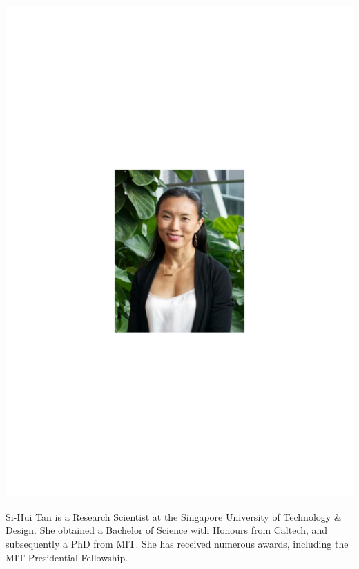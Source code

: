 \documentclass[aps,prl,twocolumn,amsmath,amssymb,nofootinbib,superscriptaddress]{revtex4}
\begin{document}
\includegraphics[width=\columnwidth]{photo_sihui_tan}

Si-Hui Tan is a Research Scientist at the Singapore University of Technology \& Design. She obtained a Bachelor of Science with Honours from Caltech, and subsequently a PhD from MIT. She has received numerous awards, including the MIT Presidential Fellowship.
\end{document}
